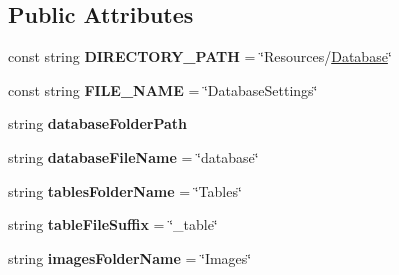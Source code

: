 \subsection*{Public Attributes}
\begin{DoxyCompactItemize}
\item 
\mbox{\label{class_d_g_tools_1_1_database_1_1_database_settings_a5bbe6ff7f549066b83beb0111331894d}} 
const string {\bfseries D\+I\+R\+E\+C\+T\+O\+R\+Y\+\_\+\+P\+A\+TH} = \char`\"{}Resources/\mbox{\hyperlink{class_d_g_tools_1_1_database_1_1_database}{Database}}\char`\"{}
\item 
\mbox{\label{class_d_g_tools_1_1_database_1_1_database_settings_a45bc90578230877b6b9998c93fd2b307}} 
const string {\bfseries F\+I\+L\+E\+\_\+\+N\+A\+ME} = \char`\"{}Database\+Settings\char`\"{}
\item 
\mbox{\label{class_d_g_tools_1_1_database_1_1_database_settings_a0e718d692189d7e75e671b4880539247}} 
string {\bfseries database\+Folder\+Path}
\item 
\mbox{\label{class_d_g_tools_1_1_database_1_1_database_settings_a43e2cdf6ef1430e9dec922fc5fb80b4f}} 
string {\bfseries database\+File\+Name} = \char`\"{}database\char`\"{}
\item 
\mbox{\label{class_d_g_tools_1_1_database_1_1_database_settings_a1c0802cb0644d80a7d89d920371093ab}} 
string {\bfseries tables\+Folder\+Name} = \char`\"{}Tables\char`\"{}
\item 
\mbox{\label{class_d_g_tools_1_1_database_1_1_database_settings_aa243d7fb049603a1b95c98e2f835892d}} 
string {\bfseries table\+File\+Suffix} = \char`\"{}\+\_\+table\char`\"{}
\item 
\mbox{\label{class_d_g_tools_1_1_database_1_1_database_settings_afc0a660d2af4ad616e3460fd49d49e47}} 
string {\bfseries images\+Folder\+Name} = \char`\"{}Images\char`\"{}
\item 

\end{DoxyCompactItemize}
